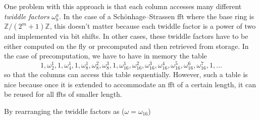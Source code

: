 \documentclass[12 pt]{amsart}
\newcommand{\om}[2] {\omega_{#1}^{#2}}
\begin{document}
One problem with this approach is that each column accesses many different
\emph{twiddle factors} $\omega_b^a$. In the case of a Sch\"onhage--Strassen fft where the base
ring is $\mathbb{Z}/(2^{m}+1)\mathbb{Z}$, this doesn't matter because each twiddle factor is a
power of two and implemented via bit shifts. In other cases, these twiddle factors have to be
either computed on the fly or precomputed and then retrieved from storage. In the case of precomputation,
we have to have in memory the table
\begin{equation}
\label{ifft_fma_tab}
1,\om{2}{1}, 1,\om{4}{1}, 1, \om{8}{1}, \om{8}{2}, \om{8}{3}, 1, \om{16}{1}, \om{16}{2}, \om{16}{3}, \om{16}{4}, \om{16}{5}, \om{16}{6}, \om{16}{7}, 1, \dots
\end{equation}
so that the columns can access this table sequentially. However, such a table is nice because
once it is extended to accommodate an fft of a certain length, it can be reused 
for all ffts of
smaller length.

By rearranging the twiddle factors as ($\omega = \omega_{16}$)
\end{document}
